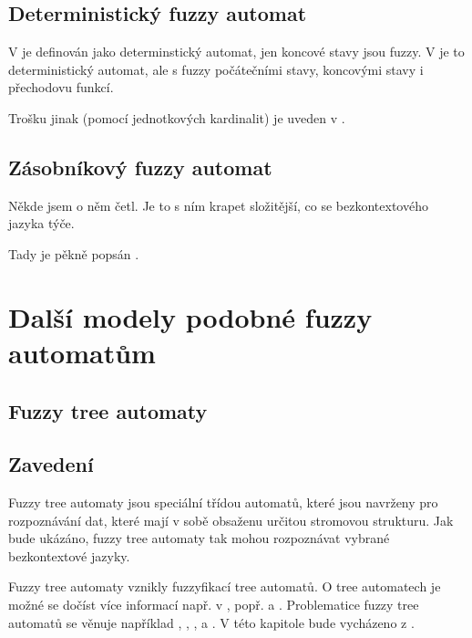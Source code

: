 \documentclass[a4paper,10pt]{article}
\begin{document}
\subsection{Deterministický fuzzy automat}
V \cite{Bel-DetFuzAut} je definován jako determinstický automat, jen koncové stavy jsou fuzzy. V \cite{LiLiLi-RelAmoSevTypFuzAut} je to deterministický automat, ale s fuzzy počátečními stavy, koncovými stavy i přechodovu funkcí.

Trošku jinak (pomocí jednotkových kardinalit) je uveden v \cite{GonGar-FuzzLangInfRanAccGuzzAutPumLemDetProc}. 


\subsection{Zásobníkový fuzzy automat}
Někde jsem o něm četl. Je to s ním krapet složitější, co se bezkontextového jazyka týče.

Tady je pěkně popsán \cite{BucPas-FuzPusAut}. 


\section{Další modely podobné fuzzy automatům}

\subsection{Fuzzy tree automaty}

\subsection{Zavedení}
Fuzzy tree automaty jsou speciální třídou automatů, které jsou navrženy pro rozpoznávání dat, které mají v sobě obsaženu určitou stromovou strukturu. Jak bude ukázáno, fuzzy tree automaty tak mohou rozpoznávat vybrané bezkontextové jazyky.

Fuzzy tree automaty vznikly fuzzyfikací  tree automatů. O  tree automatech je možné se dočíst více informací např. v \cite{Com+-TreeAutTecApp}, popř. \cite{Hua-SyntPattRecSeisOilExp} a \cite{Bez+-FuzModAlgPatRecImProc}. Problematice fuzzy tree automatů se věnuje například \cite{Lee-FuzTreAutSynPatRec}, \cite{MogZadAme-NewDirInFuzzTreeAut}, \cite{ChaJos-NoteFuzzTreeAut}, \cite{EsiLiu-FuzzTreeAut} a \cite{MorMal-FuzzyAutLang}. V této kapitole bude vycházeno z \cite{MorMal-FuzzyAutLang}.
\end{document}
